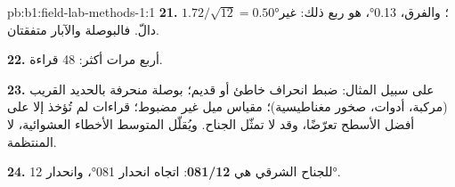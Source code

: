 \begin{solution}{pb:b1:field-lab-methods-1:1}
\textbf{21.} $1.72/\sqrt{12} = \ang{0.50}$؛ والفرق، \ang{0.13}، هو ربع ذلك: غير دالّ. فالبوصلة والآبار متفقتان.

\textbf{22.} أربع مرات أكثر: 48 قراءة.

\textbf{23.} على سبيل المثال: ضبط انحراف خاطئ أو قديم؛ بوصلة منحرفة بالحديد القريب (مركبة، أدوات، صخور مغناطيسية)؛ مقياس ميل غير مضبوط؛ قراءات لم تُؤخذ إلا على أفضل الأسطح تعرّضًا، وقد لا تمثّل الجناح. ويُقلّل المتوسط الأخطاء العشوائية، لا المنتظمة.

\textbf{24.}  للجناح الشرقي هي \textbf{081/12}: اتجاه انحدار \ang{081}، وانحدار \ang{12}.
\end{solution}
